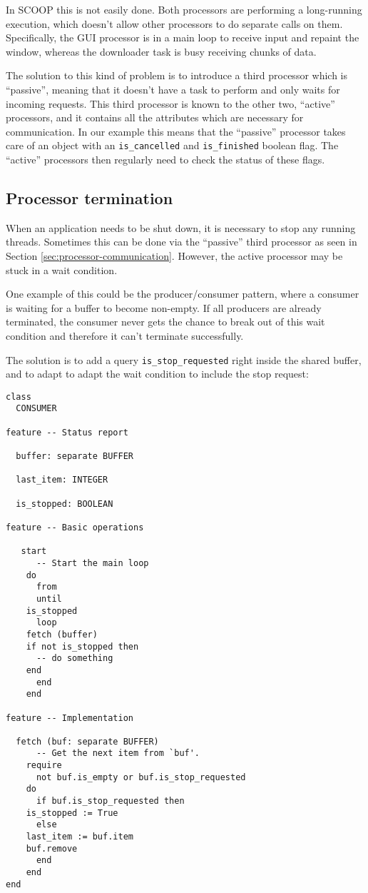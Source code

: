 \documentclass[a4paper,10pt]{article}
\begin{document}
In SCOOP this is not easily done.
Both processors are performing a long-running execution, which doesn't allow other processors to do separate calls on them.
Specifically, the GUI processor is in a main loop to receive input and repaint the window, whereas the downloader task is busy receiving chunks of data.

The solution to this kind of problem is to introduce a third processor which is ``passive'', meaning that it doesn't have a task to perform and only waits for incoming requests.
This third processor is known to the other two, ``active'' processors, and it contains all the attributes which are necessary for communication.
In our example this means that the ``passive'' processor takes care of an object with an \lstinline!is_cancelled! and \lstinline!is_finished! boolean flag.
The ``active'' processors then regularly need to check the status of these flags.

\subsection{Processor termination}
\label{sec:processor-termination}

When an application needs to be shut down, it is necessary to stop any running threads.
Sometimes this can be done via the ``passive'' third processor as seen in Section \ref{sec:processor-communication}.
However, the active processor may be stuck in a wait condition.

One example of this could be the producer/consumer pattern, where a consumer is waiting for a buffer to become non-empty.
If all producers are already terminated, the consumer never gets the chance to break out of this wait condition and therefore it can't terminate successfully.

The solution is to add a query \lstinline!is_stop_requested! right inside the shared buffer, and to adapt to adapt the wait condition to include the stop request:

\begin{lstlisting}
class
  CONSUMER

feature -- Status report

  buffer: separate BUFFER
  
  last_item: INTEGER
  
  is_stopped: BOOLEAN
  
feature -- Basic operations
  
   start
      -- Start the main loop
    do
      from 
      until 
	is_stopped
      loop
	fetch (buffer)
	if not is_stopped then
	  -- do something
	end
      end
    end
  
feature -- Implementation

  fetch (buf: separate BUFFER)
      -- Get the next item from `buf'.
    require
      not buf.is_empty or buf.is_stop_requested
    do
      if buf.is_stop_requested then
	is_stopped := True
      else
	last_item := buf.item
	buf.remove
      end
    end
end
\end{lstlisting}
\end{document}

